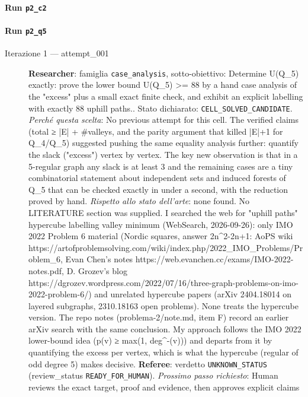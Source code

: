 \documentclass[11pt,a4paper]{article}
\begin{document}
\paragraph{Run \texttt{p2\_c2}}
\paragraph{Run \texttt{p2\_q5}}
\begin{description}
\item[Iterazione 1 — attempt\_001]
\textbf{Researcher}: famiglia \texttt{case\_analysis}, sotto-obiettivo: Determine U(Q\_5) exactly: prove the lower bound U(Q\_5) \textgreater{}= 88 by a hand case analysis of the "excess" plus a small exact finite check, and exhibit an explicit labelling with exactly 88 uphill paths.. Stato dichiarato: \texttt{CELL\_SOLVED\_CANDIDATE}.
\emph{Perché questa scelta}: No previous attempt for this cell. The verified claims (total ≥ |E| + \#valleys, and the parity argument that killed |E|+1 for Q\_4/Q\_5) suggested pushing the same equality analysis further: quantify the slack ("excess") vertex by vertex. The key new observation is that in a 5-regular graph any slack is at least 3 and the remaining cases are a tiny combinatorial statement about independent sets and induced forests of Q\_5 that can be checked exactly in under a second, with the reduction proved by hand.
\emph{Rispetto allo stato dell'arte}: none found. No LITERATURE section was supplied. I searched the web for "uphill paths" hypercube labelling valley minimum (WebSearch, 2026-09-26): only IMO 2022 Problem 6 material (Nordic squares, answer 2n\textasciicircum{}2-2n+1: AoPS wiki https://artofproblemsolving.com/wiki/index.php/2022\_IMO\_Problems/Problem\_6, Evan Chen's notes https://web.evanchen.cc/exams/IMO-2022-notes.pdf, D. Grozev's blog https://dgrozev.wordpress.com/2022/07/16/three-graph-problems-on-imo-2022-problem-6/) and unrelated hypercube papers (arXiv 2404.18014 on layered subgraphs, 2310.18163 open problems). None treats the hypercube version. The repo notes (problema-2/note.md, item F) record an earlier arXiv search with the same conclusion. My approach follows the IMO 2022 lower-bound idea (p(v) ≥ max(1, deg\textasciicircum{}-(v))) and departs from it by quantifying the excess per vertex, which is what the hypercube (regular of odd degree 5) makes decisive.
\textbf{Referee}: verdetto \texttt{UNKNOWN\_STATUS} (review\_status \texttt{READY\_FOR\_HUMAN}).
\emph{Prossimo passo richiesto}: Human reviews the exact target, proof and evidence, then approves explicit claims
\end{description}
\end{document}
